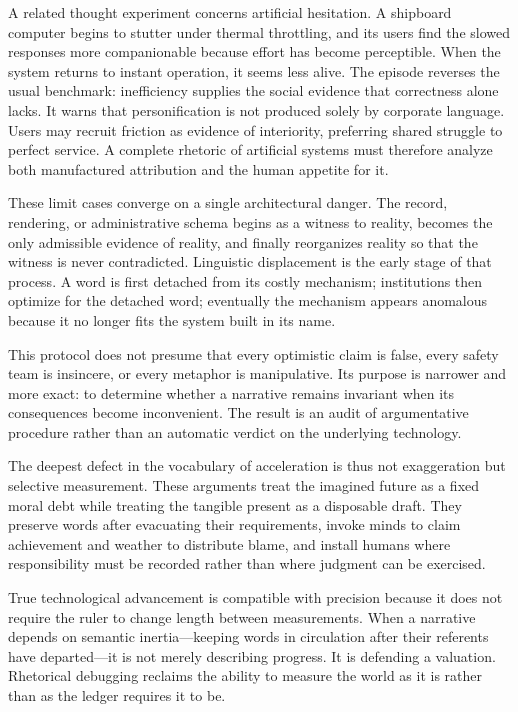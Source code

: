 \documentclass[11pt]{article}
\begin{document}
A related thought experiment concerns artificial hesitation. A shipboard computer begins to stutter under thermal throttling, and its users find the slowed responses more companionable because effort has become perceptible. When the system returns to instant operation, it seems less alive. The episode reverses the usual benchmark: inefficiency supplies the social evidence that correctness alone lacks. It warns that personification is not produced solely by corporate language. Users may recruit friction as evidence of interiority, preferring shared struggle to perfect service. A complete rhetoric of artificial systems must therefore analyze both manufactured attribution and the human appetite for it.

These limit cases converge on a single architectural danger. The record, rendering, or administrative schema begins as a witness to reality, becomes the only admissible evidence of reality, and finally reorganizes reality so that the witness is never contradicted. Linguistic displacement is the early stage of that process. A word is first detached from its costly mechanism; institutions then optimize for the detached word; eventually the mechanism appears anomalous because it no longer fits the system built in its name.

This protocol does not presume that every optimistic claim is false, every safety team is insincere, or every metaphor is manipulative. Its purpose is narrower and more exact: to determine whether a narrative remains invariant when its consequences become inconvenient. The result is an audit of argumentative procedure rather than an automatic verdict on the underlying technology.

The deepest defect in the vocabulary of acceleration is thus not exaggeration but selective measurement. These arguments treat the imagined future as a fixed moral debt while treating the tangible present as a disposable draft. They preserve words after evacuating their requirements, invoke minds to claim achievement and weather to distribute blame, and install humans where responsibility must be recorded rather than where judgment can be exercised.

True technological advancement is compatible with precision because it does not require the ruler to change length between measurements. When a narrative depends on semantic inertia---keeping words in circulation after their referents have departed---it is not merely describing progress. It is defending a valuation. Rhetorical debugging reclaims the ability to measure the world as it is rather than as the ledger requires it to be.
\end{document}
